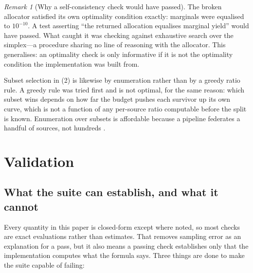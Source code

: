 \documentclass[11pt,twocolumn,a4paper]{article}
\theoremstyle{thmstyle}
\theoremstyle{definition}
\theoremstyle{remark}
\newtheorem{remark}[theorem]{Remark}
\begin{document}
\begin{remark}[Why a self-consistency check would have passed]
\label{rem:selfconsistency}
The broken allocator satisfied its own optimality condition exactly:
marginals were equalised to $10^{-10}$. A test asserting ``the returned
allocation equalises marginal yield'' would have passed. What caught it
was checking against exhaustive search over the simplex---a procedure
sharing no line of reasoning with the allocator. This generalises: an
optimality check is only informative if it is not the optimality
condition the implementation was built from.
\end{remark}

Subset selection in (2) is likewise by enumeration rather
than by a greedy ratio rule. A greedy rule was tried first and is not
optimal, for the same reason: which subset wins depends on how far the
budget pushes each survivor up its own curve, which is not a function of
any per-source ratio computable before the split is known. Enumeration
over subsets is affordable because a pipeline federates a handful of
sources, not hundreds \citep{cormen2009}.



\section{Validation}
\label{sec:validation}

\subsection{What the suite can establish, and what it cannot}

Every quantity in this paper is closed-form except where noted, so most
checks are exact evaluations rather than estimates. That removes sampling
error as an explanation for a pass, but it also means a passing check
establishes only that the implementation computes what the formula says.
Three things are done to make the suite capable of failing:
\end{document}
